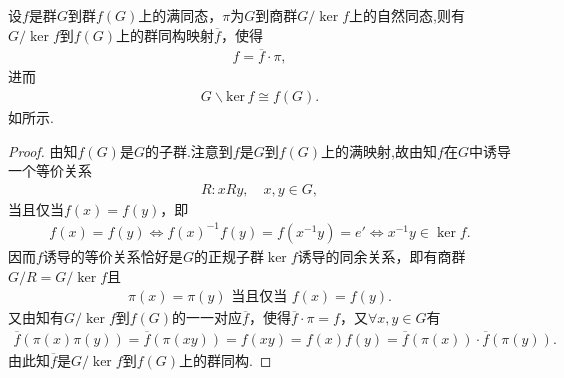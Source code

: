 \documentclass[../../main.tex]{subfiles}%
\begin{document}
\begin{theorem}[群的同态基本定理]\label{theorem:群的同态基本定理}
设$f$是群$G$到群$f(G)$上的满同态，$\pi$为$G$到商群$G/\ker f$上的自然同态,则有$G/\ker f$到$f(G)$上的群同构映射$\overline{f}$，使得
\begin{align}
f = \overline{f} \cdot \pi, \label{eq:1.gdgp9343f43dc3237.123r3te4g45y4h5h56}
\end{align}
进而
\begin{align*}
G\backslash \mathrm{ker}\,f\cong  f(G).
\end{align*}
如所示.
\end{theorem}
\begin{note}
\begin{figure}[H]
\centering
\caption{}
\label{figure:图1.7}
\end{figure}
\end{note}
\begin{proof}
由知$f(G)$是$G$的子群.注意到$f$是$G$到$f(G)$上的满映射,故由知$f$在$G$中诱导一个等价关系
\begin{align*}
R: xRy, \quad x, y \in G,
\end{align*}
当且仅当$f(x) = f(y)$，即
\begin{align*}
f(x)=f(y) \iff f(x)^{-1}f(y) = f(x^{-1}y) = e'\iff x^{-1}y \in \ker f .
\end{align*}
因而$f$诱导的等价关系恰好是$G$的正规子群$\ker f$诱导的同余关系，即有商群$G/R = G/\ker f$且
\begin{align*}
\pi(x) = \pi(y) \text{ 当且仅当 } f(x) = f(y).
\end{align*}
又由知有$G/\ker f$到$f(G)$的一一对应$\overline{f}$，使得$\overline{f} \cdot \pi = f$，又$\forall x, y \in G$有
\begin{align*}
\overline{f}(\pi(x)\pi(y)) = \overline{f}(\pi(xy)) = f(xy) = f(x)f(y) = \overline{f}(\pi(x)) \cdot \overline{f}(\pi(y)).
\end{align*}
由此知$\overline{f}$是$G/\ker f$到$f(G)$上的群同构.

\end{proof}
\end{document}
